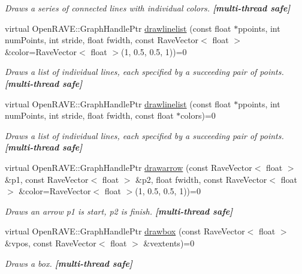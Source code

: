 \begin{DoxyCompactItemize}
\begin{DoxyCompactList}\small\item\em Draws a series of connected lines with individual colors. {\bfseries \mbox{[}multi-\/thread safe\mbox{]}} \item\end{DoxyCompactList}\item 
virtual OpenRAVE::GraphHandlePtr \hyperlink{classOpenRAVE_1_1EnvironmentBase_a4ad6149f9edca071a45a8d05f5713ecb}{drawlinelist} (const float $\ast$ppoints, int numPoints, int stride, float fwidth, const RaveVector$<$ float $>$ \&color=RaveVector$<$ float $>$(1, 0.5, 0.5, 1))=0
\begin{DoxyCompactList}\small\item\em Draws a list of individual lines, each specified by a succeeding pair of points. {\bfseries \mbox{[}multi-\/thread safe\mbox{]}} \item\end{DoxyCompactList}\item 
virtual OpenRAVE::GraphHandlePtr \hyperlink{classOpenRAVE_1_1EnvironmentBase_a6b14130da89871c94465f94aed704f1e}{drawlinelist} (const float $\ast$ppoints, int numPoints, int stride, float fwidth, const float $\ast$colors)=0
\begin{DoxyCompactList}\small\item\em Draws a list of individual lines, each specified by a succeeding pair of points. {\bfseries \mbox{[}multi-\/thread safe\mbox{]}} \item\end{DoxyCompactList}\item 
virtual OpenRAVE::GraphHandlePtr \hyperlink{classOpenRAVE_1_1EnvironmentBase_a3f00f299110fe455e0c4df096695b985}{drawarrow} (const RaveVector$<$ float $>$ \&p1, const RaveVector$<$ float $>$ \&p2, float fwidth, const RaveVector$<$ float $>$ \&color=RaveVector$<$ float $>$(1, 0.5, 0.5, 1))=0
\begin{DoxyCompactList}\small\item\em Draws an arrow p1 is start, p2 is finish. {\bfseries \mbox{[}multi-\/thread safe\mbox{]}} \item\end{DoxyCompactList}\item 
virtual OpenRAVE::GraphHandlePtr \hyperlink{classOpenRAVE_1_1EnvironmentBase_a97ad30e79fe363aa5cbda928b4edee37}{drawbox} (const RaveVector$<$ float $>$ \&vpos, const RaveVector$<$ float $>$ \&vextents)=0
\begin{DoxyCompactList}\small\item\em Draws a box. {\bfseries \mbox{[}multi-\/thread safe\mbox{]}} \item\end{DoxyCompactList}\item 

\end{DoxyCompactItemize}
